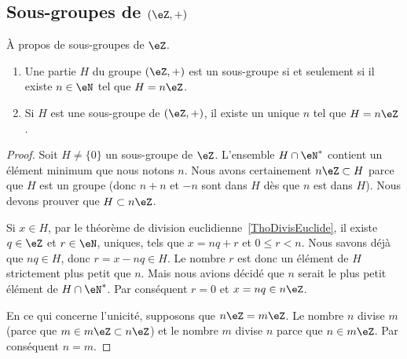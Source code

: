 \subsection{Sous-groupes de \texorpdfstring{\( (\eZ,+)\)}{(Z,+)}}

\begin{proposition} \label{PropSsgpZestnZ}
    À propos de sous-groupes de \( \eZ\).
    \begin{enumerate}
        \item
	Une partie \( H\) du groupe \( (\eZ,+)\) est un sous-groupe si et seulement si il existe \( n\in\eN\) tel que \( H=n\eZ\).
\item       \label{ITEMooOWNZooUsYRok}
    Si \( H\) est une sous-groupe de \( (\eZ,+)\), il existe un unique \( n\) tel que \( H=n\eZ\).
    \end{enumerate}
\end{proposition}

\begin{proof}
	Soit \( H\neq\{ 0 \}\) un sous-groupe de \( \eZ\). L'ensemble \( H\cap\eN^*\) contient un élément minimum que nous notons \( n\). Nous avons certainement \( n\eZ\subset H\) parce que \( H\) est un groupe (donc \( n+n\) et \( -n\) sont dans \( H\) dès que \( n\) est dans \( H\)). Nous devons prouver que \( H\subset n\eZ\).

	Si \( x\in H\), par le théorème de division euclidienne~\ref{ThoDivisEuclide}, il existe \( q\in\eZ\) et \( r\in\eN \), uniques, tels que \( x=nq+r\) et \(0 \leq r < n \). Nous savons déjà que \( nq\in H\), donc \( r = x - nq \in H \). Le nombre \( r\) est donc un élément de \( H\) strictement plus petit que \( n\). Mais nous avions décidé que \( n\) serait le plus petit élément de \( H\cap\eN^*\). Par conséquent \( r=0\) et \( x=nq\in n\eZ\).


    En ce qui concerne l'unicité, supposons que \( n\eZ=m\eZ\). Le nombre \( n\) divise \( m\) (parce que \( m\in m\eZ\subset n\eZ\)) et le nombre \( m\) divise \( n\) parce que \( n\in m\eZ\). Par conséquent \( n=m\).
\end{proof}



